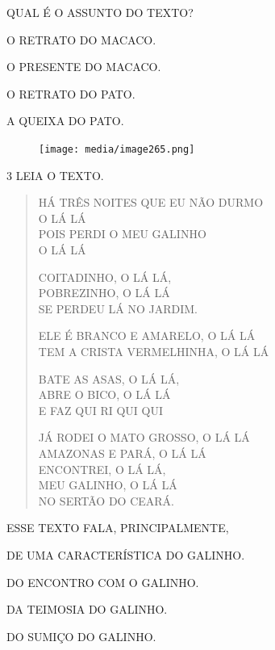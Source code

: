 QUAL É O ASSUNTO DO TEXTO?

\begin{escolha}
\item O RETRATO DO MACACO.

\item O PRESENTE DO MACACO.

\item O RETRATO DO PATO.

\item A QUEIXA DO PATO.
\end{escolha}

\begin{figure}[H]
\texttt{[image: media/image265.png]}
\end{figure}

\pagebreak
\num{3} LEIA O TEXTO.

\begin{myquote}
\begin{verse}
HÁ TRÊS NOITES QUE EU NÃO DURMO\\
O LÁ LÁ\\
POIS PERDI O MEU GALINHO\\
O LÁ LÁ


COITADINHO, O LÁ LÁ,\\
POBREZINHO, O LÁ LÁ\\
SE PERDEU LÁ NO JARDIM.


ELE É BRANCO E AMARELO, O LÁ LÁ\\
TEM A CRISTA VERMELHINHA, O LÁ LÁ


BATE AS ASAS, O LÁ LÁ,\\
ABRE O BICO, O LÁ LÁ\\
E FAZ QUI RI QUI QUI


JÁ RODEI O MATO GROSSO, O LÁ LÁ\\
AMAZONAS E PARÁ, O LÁ LÁ\\
ENCONTREI, O LÁ LÁ,\\
MEU GALINHO, O LÁ LÁ\\
NO SERTÃO DO CEARÁ.
\end{verse}

\end{myquote}

ESSE TEXTO FALA, PRINCIPALMENTE,

\begin{escolha}
\item DE UMA CARACTERÍSTICA DO GALINHO.

\item DO ENCONTRO COM O GALINHO.

\item DA TEIMOSIA DO GALINHO.

\item DO SUMIÇO DO GALINHO.
\end{escolha}





